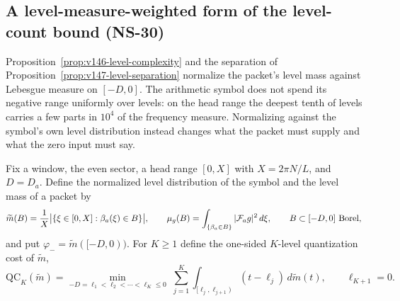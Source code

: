 \subsection*{A level-measure-weighted form of the level-count bound (NS-30)}

Proposition~\ref{prop:v146-level-complexity} and the separation of
Proposition~\ref{prop:v147-level-separation} normalize the packet's level
mass against Lebesgue measure on $[-D,0]$. The arithmetic symbol does not
spend its negative range uniformly over levels: on the head range the
deepest tenth of levels carries a few parts in $10^4$ of the frequency
measure. Normalizing against the symbol's own level distribution instead
changes what the packet must supply and what the zero input must say.

Fix a window, the even sector, a head range $[0,X]$ with $X=2\pi N/L$,
and $D=D_a$. Define the normalized level distribution of the symbol and
the level mass of a packet by
\[
 \widetilde m(B)=\frac1X\bigl|\{\xi\in[0,X]:\beta_a(\xi)\in B\}\bigr|,
 \qquad
 \mu_g(B)=\int_{\{\beta_a\in B\}}|\mathcal F_ag|^2\,d\xi,
 \qquad B\subset[-D,0]\ \hbox{Borel},
\]
and put $\varphi_-=\widetilde m([-D,0))$. For $K\ge1$ define the
one-sided $K$-level quantization cost of $\widetilde m$,
\begin{equation}\label{eq:v148-qc}
 \mathrm{QC}_K(\widetilde m)
 =\min_{-D=\ell_1<\ell_2<\cdots<\ell_K\le0}\;
  \sum_{j=1}^{K}\int_{[\ell_j,\ell_{j+1})}(t-\ell_j)\,d\widetilde m(t),
 \qquad \ell_{K+1}=0.
\end{equation}

